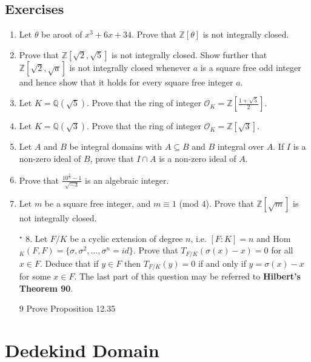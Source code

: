 \subsection{Exercises}
\begin{enumerate}
\item Let $\theta$ be aroot of $x^3+6x+34$. Prove that $\mathbb{Z}[\theta]$ is not integrally closed.
\item Prove that $\mathbb{Z}[\sqrt{2},\sqrt{5}]$ is not integrally closed. Show further that $\mathbb{Z}[\sqrt{2},\sqrt{a}]$ is not integrally closed whenever $a$ is a square free odd integer and hence show that it holds for every square free integer $a$.
\item Let $K=\mathbb{Q}(\sqrt{5})$. Prove that the ring of integer $\mathcal{O}_K=\mathbb{Z}[\frac{1+\sqrt{5}}{2}]$.
\item Let $K=\mathbb{Q}(\sqrt{3})$. Prove that the ring of integer $\mathcal{O}_K=\mathbb{Z}[\sqrt{3}]$.
\item Let $A$ and $B$ be integral domains with $A \subseteq B$ and $B$ integral over $A$. If $I$ is a non-zero ideal of $B$, prove that $I \cap A$ is a non-zero ideal of $A$.
\item Prove that $\frac{10^{\frac{2}{3}}-1}{\sqrt{-3}}$ is an algebraic integer.
\item Let $m$ be a square free integer, and $m \equiv 1$ (mod $4$). Prove that $\mathbb{Z}[\sqrt{m}]$ is not integrally closed.
\item[$^\star$ 8.] Let $F/K$ be a cyclic extension of degree $n$, i.e. $[F:K]=n$ and Hom$_K(F,F)=\{\sigma,\sigma^2,\ldots,\sigma^n=id\}$. Prove that $T_{F/K}(\sigma(x)-x) = 0$ for all $x \in F$. Deduce that if $y \in F$ then $T_{F/K}(y) = 0$
if and only if $y = \sigma(x) - x$ for some $x \in F$. The last part of this question may be referred to {\bf Hilbert's Theorem 90}.
\item[9] Prove Proposition 12.35
\end{enumerate}

\section{Dedekind Domain}
